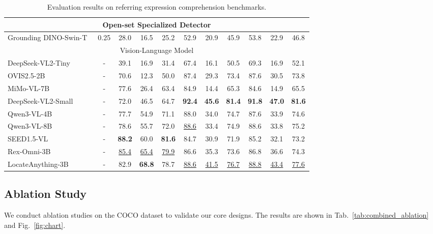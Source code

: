 \documentclass{llmxive}
\begin{document}
\begin{table}[t]
{\begin{tabular}{l|c|ccc|ccc|ccc}
\multicolumn{11}{c}{{Open-set Specialized Detector}} \\
\midrule
Grounding DINO-Swin-T~\citep{liu2023grounding} & 0.25 
& 28.0 & 16.5 & 25.2 
& 52.9 & 20.9 & 45.9 
& 53.8 & 22.9 & 46.8 \\
\midrule
\multicolumn{11}{c}{{Vision-Language Model}} \\
\midrule
DeepSeek-VL2-Tiny~\citep{wu2024deepseekvl2mixtureofexpertsvisionlanguagemodels} & - 
& 39.1 & 16.9 & 31.4 
& 67.4 & 16.1 & 50.5 
& 69.3 & 16.9 & 52.1 \\
OVIS2.5-2B~\citep{lu2025ovis25technicalreport} & - 
& 70.6 & 12.3 & 50.0 
& 87.4 & 29.3 & 73.4 
& 87.6 & 30.5 & 73.8 \\
MiMo-VL-7B~\citep{coreteam2025mimovltechnicalreport} & - 
& 77.6 & 26.4 & 63.4 
& 84.9 & 14.4 & 65.3 
& 84.6 & 14.9 & 65.5 \\
DeepSeek-VL2-Small~\citep{wu2024deepseekvl2mixtureofexpertsvisionlanguagemodels} & - 
& 72.0 & 46.5 & 64.7 
& \textbf{92.4} & \textbf{45.6} & \textbf{81.4} 
& \textbf{91.8} & \textbf{47.0} & \textbf{81.6} \\
Qwen3-VL-4B~\citep{bai2025qwen3vltechnicalreport} & - 
& 77.7 & 54.9 & 71.1
& 88.0 & 34.0 & 74.7
& 87.6 & 33.9 & 74.6 \\
Qwen3-VL-8B~\citep{bai2025qwen3vltechnicalreport} & -
& 78.6 & 55.7 & 72.0 
& \underline{88.6} & 33.4 & 74.9 
& 88.6 & 33.8 & 75.2 \\
SEED1.5-VL~\citep{guo2025seed15vltechnicalreport} & - 
& \textbf{88.2} & 60.0 & \textbf{81.6} 
& 84.7 & 30.9 & 71.9 
& 85.2 & 32.1 & 73.2 \\
Rex-Omni-3B~\citep{jiang2025rexomni} & - 
& \underline{85.4} & \underline{65.4} & \underline{79.9} 
& 86.6 & 35.3 & 73.6 
& 86.8 & 36.6 & 74.3 \\
\rowcolor{lightblue!10}
LocateAnything-3B & - 
& 82.9 & \textbf{68.8} & 78.7 
& \underline{88.6} & \underline{41.5} & \underline{76.7} 
& \underline{88.8} & \underline{43.4} & \underline{77.6} \\
\bottomrule
\end{tabular}
    }
    \label{tab:referring_detection}
\caption{Evaluation results on referring expression comprehension benchmarks.}
\end{table}


\vspace{-2mm}
\subsection{Ablation Study}
\vspace{-1mm}
We conduct ablation studies on the COCO dataset to validate our core designs. The results are shown in Tab.~\ref{tab:combined_ablation} and Fig.~\ref{fig:chart}.
\end{document}
